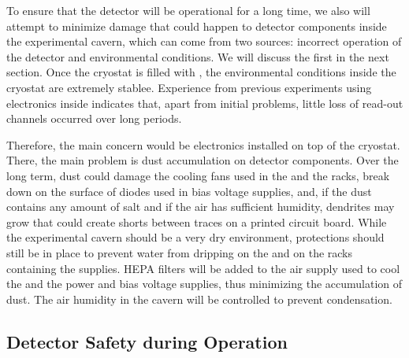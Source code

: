 To ensure that the  detector will be operational for a long
time, we also will attempt to minimize 
damage that could happen to detector components inside the 
experimental cavern, which can come from two sources: incorrect
operation of the detector and environmental conditions. We
will discuss the first in the next section. Once the cryostat is filled with , the environmental
conditions inside the cryostat are extremely stablee. Experience from 
previous experiments using electronics inside 
 indicates that, apart from initial problems, little loss of read-out channels occurred over long periods. 

Therefore, the main concern would be electronics 
installed on top of the cryostat. There, the main problem
is dust accumulation on detector components. Over the long
term, dust could damage the cooling fans used
in the  and the  racks, break down 
on the surface of diodes used in bias voltage supplies,
and, if the dust contains any amount of salt and if the air has sufficient humidity, dendrites may grow that could create 
shorts between traces on a printed circuit board. While the
experimental cavern should be a very dry environment,
protections should still be in place to prevent water from 
dripping on the  and on the racks containing the
 supplies. HEPA filters will be added to the
air supply used to cool the  and the  power and bias voltage supplies, thus minimizing
the accumulation of dust. The air humidity in the cavern 
will be controlled to prevent condensation.

\subsection{Detector Safety during Operation}
\label{sec:fdsp-tpcelec-safety-detops}

